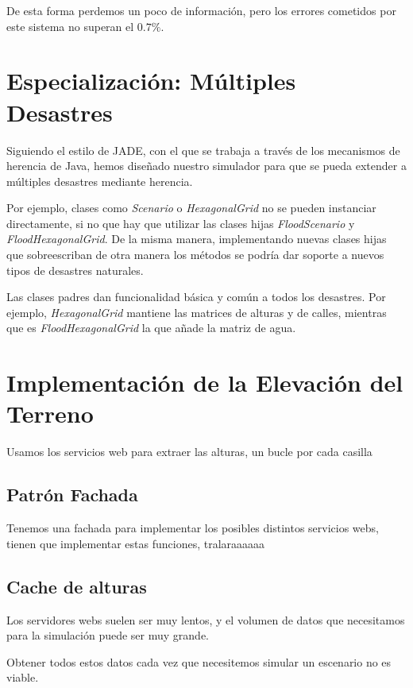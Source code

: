 De esta forma perdemos un poco de información, pero los errores cometidos por
este sistema no superan el \begin{math}0.7\%\end{math}.

\section*{Especialización: Múltiples Desastres}

Siguiendo el estilo de JADE, con el que se trabaja a través de los mecanismos
de herencia de Java, hemos diseñado nuestro simulador para que se pueda
extender a múltiples desastres mediante herencia.

Por ejemplo, clases como {\em Scenario} o {\em HexagonalGrid} no se pueden
instanciar directamente, si no que hay que utilizar las clases hijas {\em
FloodScenario} y {\em FloodHexagonalGrid}. De la misma manera, implementando
nuevas clases hijas que sobreescriban de otra manera los métodos se podría dar
soporte a nuevos tipos de desastres naturales.

Las clases padres dan funcionalidad básica y común a todos los desastres. Por
ejemplo, {\em HexagonalGrid} mantiene las matrices de alturas y de calles,
mientras que es {\em FloodHexagonalGrid} la que añade la matriz de agua.

\section*{Implementación de la Elevación del Terreno}
Usamos los servicios web para extraer las alturas, un bucle por cada casilla
\subsection*{Patrón Fachada} %
Tenemos una fachada para implementar los posibles distintos servicios webs,
tienen que implementar estas funciones, tralaraaaaaa
\subsection*{Cache de alturas}
Los servidores webs suelen ser muy lentos, y el volumen de datos que
necesitamos para la simulación puede ser muy grande.

Obtener todos estos datos cada vez que necesitemos simular un escenario no es
viable.

